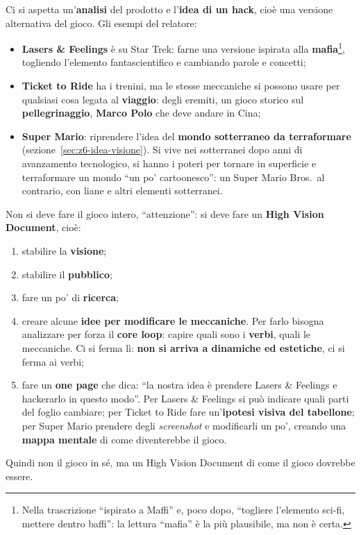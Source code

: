 Ci si aspetta un'\textbf{analisi} del prodotto e l'\textbf{idea di un hack},
cioè una versione alternativa del gioco. Gli esempi del relatore:
\begin{itemize}
  \item \textbf{Lasers \& Feelings} è su Star Trek: farne una versione ispirata
        alla \textbf{mafia}\footnote{Nella trascrizione ``ispirato a Maffi'' e,
        poco dopo, ``togliere l'elemento sci-fi, mettere dentro baffi'':
        la lettura ``mafia'' è la più plausibile, ma non è certa.}, togliendo
        l'elemento fantascientifico e cambiando parole e concetti;
  \item \textbf{Ticket to Ride} ha i trenini, ma le stesse meccaniche si possono
        usare per qualsiasi cosa legata al \textbf{viaggio}: degli eremiti, un
        gioco storico sul \textbf{pellegrinaggio}, \textbf{Marco Polo} che deve
        andare in Cina;
  \item \textbf{Super Mario}: riprendere l'idea del \textbf{mondo sotterraneo da
        terraformare} (sezione~\ref{sec:z6-idea-visione}). Si vive nei sotterranei
        dopo anni di avanzamento tecnologico, si hanno i poteri per tornare in
        superficie e terraformare un mondo ``un po' cartoonesco'': un Super Mario
        Bros.\ al contrario, con liane e altri elementi sotterranei.
\end{itemize}
Non si deve fare il gioco intero, ``attenzione'': si deve fare un \textbf{High
Vision Document}, cioè:
\begin{enumerate}
  \item stabilire la \textbf{visione};
  \item stabilire il \textbf{pubblico};
  \item fare un po' di \textbf{ricerca};
  \item creare alcune \textbf{idee per modificare le meccaniche}. Per farlo
        bisogna analizzare per forza il \textbf{core loop}: capire quali sono i
        \textbf{verbi}, quali le meccaniche. Ci si ferma lì: \textbf{non si
        arriva a dinamiche ed estetiche}, ci si ferma ai verbi;
  \item fare un \textbf{one page} che dica: ``la nostra idea è prendere Lasers \&
        Feelings e hackerarlo in questo modo''. Per Lasers \& Feelings si può
        indicare quali parti del foglio cambiare; per Ticket to Ride fare
        un'\textbf{ipotesi visiva del tabellone}; per Super Mario prendere degli
        \emph{screenshot} e modificarli un po', creando una \textbf{mappa mentale}
        di come diventerebbe il gioco.
\end{enumerate}
Quindi non il gioco in sé, ma un High Vision Document di come il gioco dovrebbe
essere.

